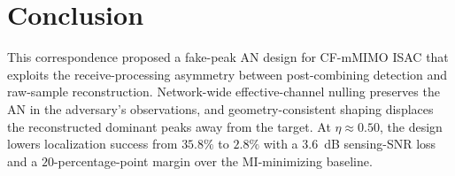 \documentclass[letterpaper,journal]{IEEEtran}
\begin{document}
\section{Conclusion}
\label{sec:conclusion}
This correspondence proposed a fake-peak AN design for CF-mMIMO ISAC that exploits the receive-processing asymmetry between post-combining detection and raw-sample reconstruction. Network-wide effective-channel nulling preserves the AN in the adversary's observations, and geometry-consistent shaping displaces the reconstructed dominant peaks away from the target. At $\eta\approx0.50$, the design lowers localization success from $35.8\%$ to $2.8\%$ with a $3.6$~dB sensing-SNR loss and a $20$-percentage-point margin over the MI-minimizing baseline.



\end{document}
